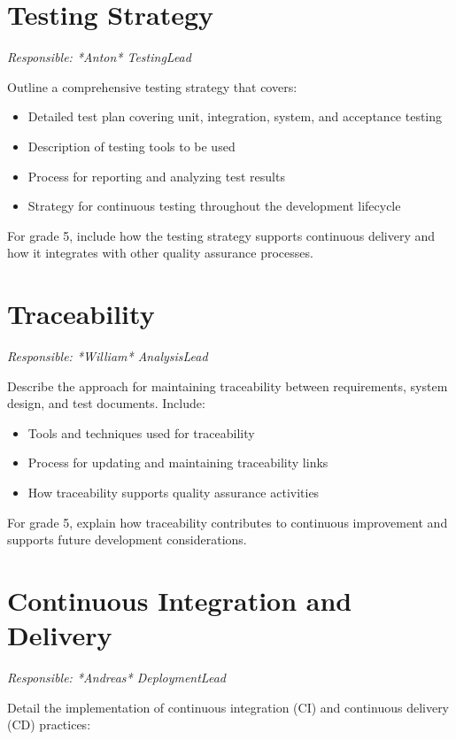 \documentclass{article}
\begin{document}
\section{Testing Strategy}
\textit{Responsible: *Anton* TestingLead}

Outline a comprehensive testing strategy that covers:

\begin{itemize}
    \item Detailed test plan covering unit, integration, system, and acceptance testing
    \item Description of testing tools to be used
    \item Process for reporting and analyzing test results
    \item Strategy for continuous testing throughout the development lifecycle
\end{itemize}

For grade 5, include how the testing strategy supports continuous delivery and how it integrates with other quality assurance processes.

\section{Traceability}
\textit{Responsible: *William* AnalysisLead}

Describe the approach for maintaining traceability between requirements, system design, and test documents. Include:

\begin{itemize}
    \item Tools and techniques used for traceability
    \item Process for updating and maintaining traceability links
    \item How traceability supports quality assurance activities
\end{itemize}

For grade 5, explain how traceability contributes to continuous improvement and supports future development considerations.

\section{Continuous Integration and Delivery}
\textit{Responsible: *Andreas* DeploymentLead}

Detail the implementation of continuous integration (CI) and continuous delivery (CD) practices:
\end{document}
